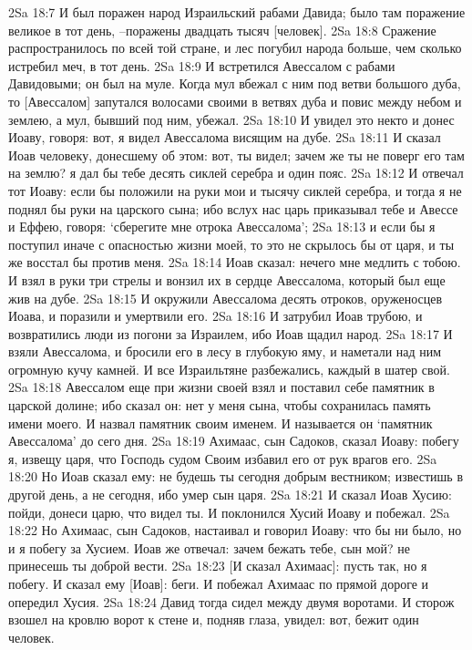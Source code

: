 2Sa 18:7  И был поражен народ Израильский рабами Давида; было там поражение великое в тот день, --поражены двадцать тысяч [человек].
2Sa 18:8  Сражение распространилось по всей той стране, и лес погубил народа больше, чем сколько истребил меч, в тот день.
2Sa 18:9  И встретился Авессалом с рабами Давидовыми; он был на муле. Когда мул вбежал с ним под ветви большого дуба, то [Авессалом] запутался волосами своими в ветвях дуба и повис между небом и землею, а мул, бывший под ним, убежал.
2Sa 18:10  И увидел это некто и донес Иоаву, говоря: вот, я видел Авессалома висящим на дубе.
2Sa 18:11  И сказал Иоав человеку, донесшему об этом: вот, ты видел; зачем же ты не поверг его там на землю? я дал бы тебе десять сиклей серебра и один пояс.
2Sa 18:12  И отвечал тот Иоаву: если бы положили на руки мои и тысячу сиклей серебра, и тогда я не поднял бы руки на царского сына; ибо вслух нас царь приказывал тебе и Авессе и Еффею, говоря: `сберегите мне отрока Авессалома';
2Sa 18:13  и если бы я поступил иначе с опасностью жизни моей, то это не скрылось бы от царя, и ты же восстал бы против меня.
2Sa 18:14  Иоав сказал: нечего мне медлить с тобою. И взял в руки три стрелы и вонзил их в сердце Авессалома, который был еще жив на дубе.
2Sa 18:15  И окружили Авессалома десять отроков, оруженосцев Иоава, и поразили и умертвили его.
2Sa 18:16  И затрубил Иоав трубою, и возвратились люди из погони за Израилем, ибо Иоав щадил народ.
2Sa 18:17  И взяли Авессалома, и бросили его в лесу в глубокую яму, и наметали над ним огромную кучу камней. И все Израильтяне разбежались, каждый в шатер свой.
2Sa 18:18  Авессалом еще при жизни своей взял и поставил себе памятник в царской долине; ибо сказал он: нет у меня сына, чтобы сохранилась память имени моего. И назвал памятник своим именем. И называется он `памятник Авессалома' до сего дня.
2Sa 18:19  Ахимаас, сын Садоков, сказал Иоаву: побегу я, извещу царя, что Господь судом Своим избавил его от рук врагов его.
2Sa 18:20  Но Иоав сказал ему: не будешь ты сегодня добрым вестником; известишь в другой день, а не сегодня, ибо умер сын царя.
2Sa 18:21  И сказал Иоав Хусию: пойди, донеси царю, что видел ты. И поклонился Хусий Иоаву и побежал.
2Sa 18:22  Но Ахимаас, сын Садоков, настаивал и говорил Иоаву: что бы ни было, но и я побегу за Хусием. Иоав же отвечал: зачем бежать тебе, сын мой? не принесешь ты доброй вести.
2Sa 18:23  [И сказал Ахимаас]: пусть так, но я побегу. И сказал ему [Иоав]: беги. И побежал Ахимаас по прямой дороге и опередил Хусия.
2Sa 18:24  Давид тогда сидел между двумя воротами. И сторож взошел на кровлю ворот к стене и, подняв глаза, увидел: вот, бежит один человек.
